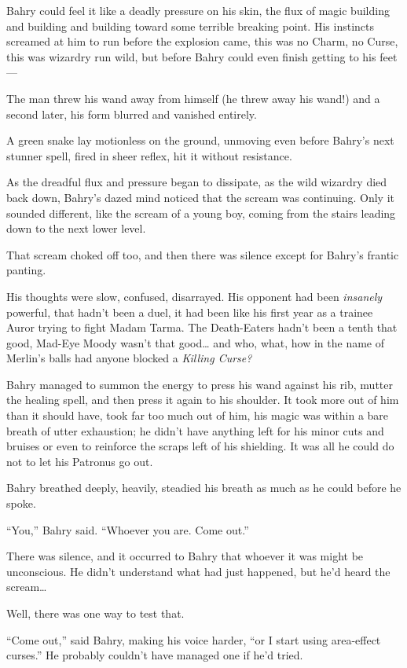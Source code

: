 Bahry could feel it like a deadly pressure on his skin, the flux of
magic building and building and building toward some terrible breaking
point. His instincts screamed at him to run before the explosion came,
this was no Charm, no Curse, this was wizardry run wild, but before
Bahry could even finish getting to his feet---

The man threw his wand away from himself (he threw away his wand!) and a
second later, his form blurred and vanished entirely.

A green snake lay motionless on the ground, unmoving even before Bahry's
next stunner spell, fired in sheer reflex, hit it without resistance.

As the dreadful flux and pressure began to dissipate, as the wild
wizardry died back down, Bahry's dazed mind noticed that the scream was
continuing. Only it sounded different, like the scream of a young boy,
coming from the stairs leading down to the next lower level.

That scream choked off too, and then there was silence except for
Bahry's frantic panting.

His thoughts were slow, confused, disarrayed. His opponent had been
\emph{insanely} powerful, that hadn't been a duel, it had been like his
first year as a trainee Auror trying to fight Madam Tarma. The
Death-Eaters hadn't been a tenth that good, Mad-Eye Moody wasn't that
good\ldots{} and who, what, how in the name of Merlin's balls had anyone
blocked a \emph{Killing Curse?}

Bahry managed to summon the energy to press his wand against his rib,
mutter the healing spell, and then press it again to his shoulder. It
took more out of him than it should have, took far too much out of him,
his magic was within a bare breath of utter exhaustion; he didn't have
anything left for his minor cuts and bruises or even to reinforce the
scraps left of his shielding. It was all he could do not to let his
Patronus go out.

Bahry breathed deeply, heavily, steadied his breath as much as he could
before he spoke.

``You,'' Bahry said. ``Whoever you are. Come out.''

There was silence, and it occurred to Bahry that whoever it was might be
unconscious. He didn't understand what had just happened, but he'd heard
the scream\ldots{}

Well, there was one way to test that.

``Come out,'' said Bahry, making his voice harder, ``or I start using
area-effect curses.'' He probably couldn't have managed one if he'd
tried.

